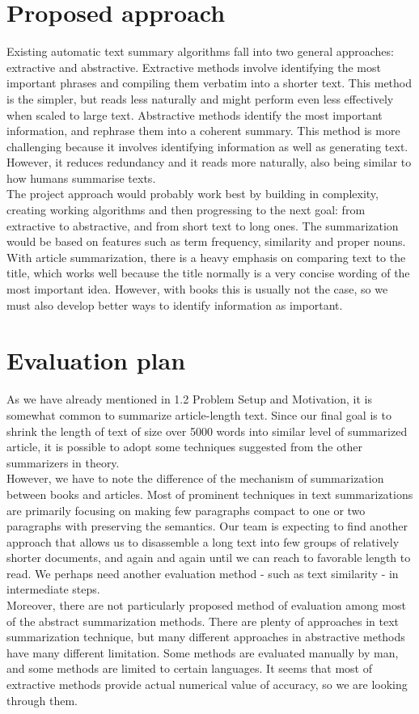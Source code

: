 \section{Proposed approach}

Existing automatic text summary algorithms fall into two general approaches: extractive and abstractive. Extractive methods involve identifying the most important phrases and compiling them verbatim into a shorter text. This method is the simpler, but reads less naturally and might perform even less effectively when scaled to large text. Abstractive methods identify the most important information, and rephrase them into a coherent summary. This method is more challenging because it involves identifying information as well as generating text. However, it reduces redundancy and it reads more naturally, also being similar to how humans summarise texts. \cite{Gaikwad2016} \\
The project approach would probably work best by building in complexity, creating working algorithms and then progressing to the next goal: from extractive to abstractive, and from short text to long ones. The summarization would be based on features such as term frequency, similarity and proper nouns. With article summarization, there is a heavy emphasis on comparing text to the title, which works well because the title normally is a very concise wording of the most important idea. However, with books this is usually not the case, so we must also develop better ways to identify information as important.

\section{Evaluation plan}

As we have already mentioned in 1.2 Problem Setup and Motivation, it is somewhat common to summarize article-length text. Since our final goal is to shrink the length of text of size over 5000 words into similar level of summarized article, it is possible to adopt some techniques suggested from the other summarizers in theory. \\
However, we have to note the difference of the mechanism of summarization between books and articles. Most of prominent techniques in text summarizations are primarily focusing on making few paragraphs compact to one or two paragraphs with preserving the semantics. Our team is expecting to find another approach that allows us to disassemble a long text into few groups of relatively shorter documents, and again and again until we can reach to favorable length to read. We perhaps need another evaluation method - such as text similarity \cite{Do} - in intermediate steps. \\
Moreover, there are not particularly proposed method of evaluation among most of the abstract summarization methods. There are plenty of approaches in text summarization technique, but many different approaches in abstractive methods have many different limitation. Some methods are evaluated manually by man, and some methods are limited to certain languages. It seems that most of extractive methods provide actual numerical value of accuracy, so we are looking through them.

